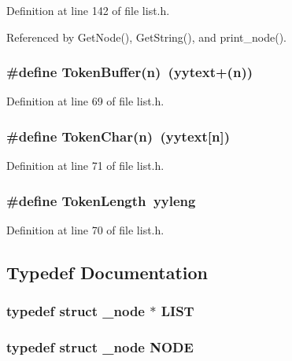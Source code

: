 Definition at line 142 of file list.h.

Referenced by Get\-Node(), Get\-String(), and print\_\-node().
\subsubsection{\setlength{\rightskip}{0pt plus 5cm}\#define Token\-Buffer(n)~(\bf{yytext}+(n))}\label{list_8h_2f9cc7c02985ba0dcf25cd911343f610}




Definition at line 69 of file list.h.
\subsubsection{\setlength{\rightskip}{0pt plus 5cm}\#define Token\-Char(n)~(\bf{yytext}[n])}\label{list_8h_48efe69a7a599d01fec3cb1e0820fff9}




Definition at line 71 of file list.h.
\subsubsection{\setlength{\rightskip}{0pt plus 5cm}\#define Token\-Length~\bf{yyleng}}\label{list_8h_692047f631bf7b506efd8a24ee6eace3}




Definition at line 70 of file list.h.

\subsection{Typedef Documentation}
\subsubsection{\setlength{\rightskip}{0pt plus 5cm}typedef struct \bf{\_\-node} $\ast$ \bf{LIST}}\label{list_8h_63ed7d118104f76001e05fcdf4db2fb2}


\subsubsection{\setlength{\rightskip}{0pt plus 5cm}typedef struct \bf{\_\-node}
 \bf{NODE}}\label{list_8h_5ea56504e56f49fc9da6f01247a18d8e}




